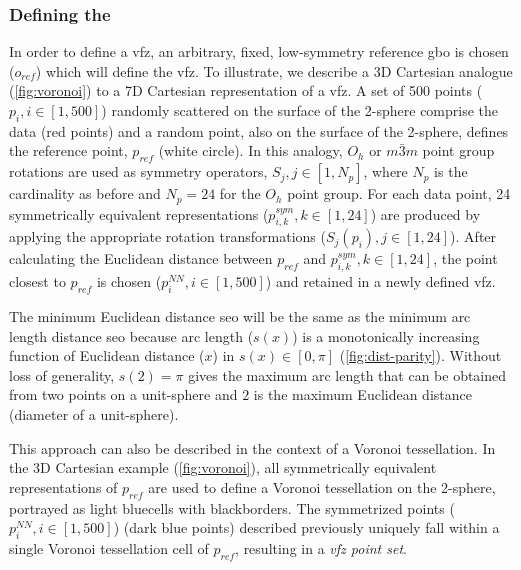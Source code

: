 \documentclass[preprint,12pt]{elsarticle}
\newcommand{\startpt}{red points}
\newcommand{\sympt}{dark blue points}
\newcommand{\refpt}{white circle}
\newcommand{\vbordercolor}{black}
\newcommand{\vcellcolor}{light blue}
\begin{document}
\subsubsection{Defining the }
\label{sec:methods:vfz}


In order to define a \gls{vfz}, an arbitrary, fixed, low-symmetry reference \gls{gbo} is chosen ($o_{ref}$) which will define the \gls{vfz}. To illustrate, we describe a 3D Cartesian analogue (\cref{fig:voronoi}) to a 7D Cartesian representation of a \gls{vfz}. A set of \num{500} points ($p_i, i\in[1,500]$) randomly scattered on the surface of the 2-sphere comprise the data (\startpt) and a random point, also on the surface of the 2-sphere, defines the reference point, $p_{ref}$ (\refpt). In this analogy, $O_h$ or $m\bar{3}m$ point group rotations are used as symmetry operators, $S_j,j\in[1,N_p]$, where $N_p$ is the cardinality as before and $N_p = 24$ for the $O_h$  point group. For each data point, \num{24} symmetrically equivalent representations ($p^{sym}_{i,k},k\in[1,24]$) are produced by applying the appropriate rotation transformations ($S_j(p_i),j\in[1,24]$). After calculating the Euclidean distance between $p_{ref}$ and $p^{sym}_{i,k},k\in[1,24]$, the point closest to $p_{ref}$ is chosen ($p^{NN}_i,i\in[1,500]$) and retained in a newly defined \gls{vfz}.

The minimum Euclidean distance \gls{seo} will be the same as the minimum arc length distance \gls{seo} because arc length ($s(x)$) is a monotonically increasing function of Euclidean distance ($x$) in $s(x)\in[0,\pi]$ (\cref{fig:dist-parity}). Without loss of generality, $s(2)=\pi$ gives the maximum arc length that can be obtained from two points on a unit-sphere and $2$ is the maximum Euclidean distance (diameter of a unit-sphere).

This approach can also be described in the context of a Voronoi tessellation. In the 3D Cartesian example (\cref{fig:voronoi}), all symmetrically equivalent representations of $p_{ref}$ are used to define a Voronoi tessellation on the 2-sphere, portrayed as \vcellcolor cells with \vbordercolor borders. The symmetrized points ($p^{NN}_i,i\in[1,500]$) (\sympt) described previously uniquely fall within a single Voronoi tessellation cell of $p_{ref}$, resulting in a \textit{\gls{vfz} point set}.
\end{document}
